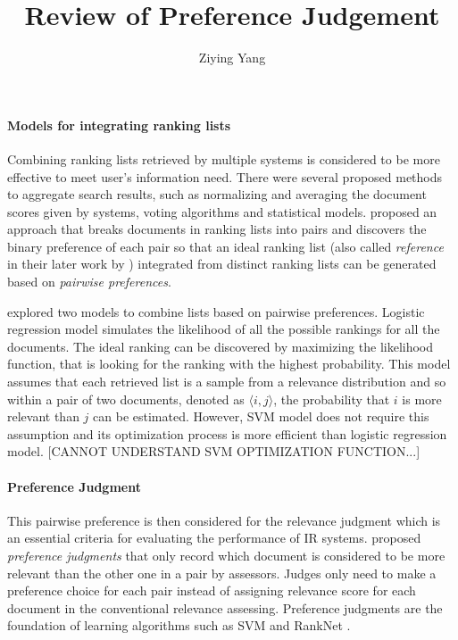 \documentclass{article}
\title{\large{Review of Preference Judgement}} %
\author{Ziying Yang}
\begin{document}
\maketitle
\paragraph{Models for integrating ranking lists}
Combining ranking lists retrieved by multiple systems is considered to be more effective to meet user's information need. There were several proposed methods to aggregate search results, such as normalizing and averaging the document scores given by systems, voting algorithms and statistical models. \citet{learn.ranking.pairwise} proposed an approach that breaks documents in ranking lists into pairs and discovers the binary preference of each pair so that an ideal ranking list (also called \textit{reference} in their later work by \citet{eval.aggregated.search}) integrated from distinct ranking lists can be generated based on \textit{pairwise preferences}.

\citet{learn.ranking.pairwise} explored two models to combine lists based on pairwise preferences. Logistic regression model simulates the likelihood of all the possible rankings for all the documents. The ideal ranking can be discovered by maximizing the likelihood function, that is looking for the ranking with the highest probability. This model assumes that each retrieved list is a sample from a relevance distribution and so within a pair of two documents, denoted as $\langle i, j \rangle$, the probability that $i$ is more relevant than $j$ can be estimated. However, SVM model does not require this assumption and its optimization process is more efficient than logistic regression model. [CANNOT UNDERSTAND SVM OPTIMIZATION FUNCTION...]

\paragraph{Preference Judgment} This pairwise preference is then considered for the relevance judgment which is an essential criteria for evaluating the performance of IR systems. \citet{here.or.there} proposed \textit{preference judgments} that only record which document is considered to be more relevant than the other one in a pair by assessors. Judges only need to make a preference choice for each pair instead of assigning relevance score for each document in the conventional relevance assessing. Preference judgments are the foundation of learning algorithms such as SVM and RankNet \cite{BennettCCJ08}. 
\end{document}
